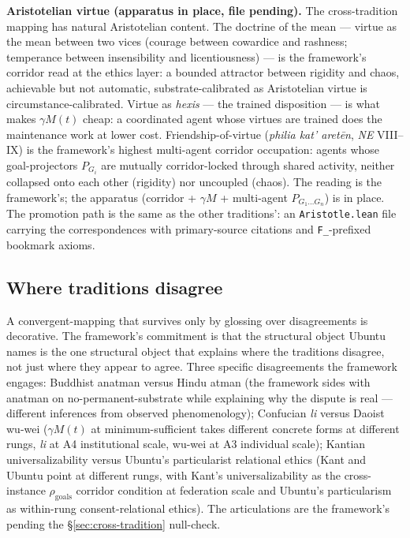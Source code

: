 \documentclass[11pt,a4paper]{article}
\begin{document}
\textbf{Aristotelian virtue (apparatus in place, file pending).} The cross-tradition mapping has natural Aristotelian content. The doctrine of the mean --- virtue as the mean between two vices (courage between cowardice and rashness; temperance between insensibility and licentiousness) --- is the framework's corridor read at the ethics layer: a bounded attractor between rigidity and chaos, achievable but not automatic, substrate-calibrated as Aristotelian virtue is circumstance-calibrated. Virtue as \emph{hexis} --- the trained disposition --- is what makes $\gamma M(t)$ cheap: a coordinated agent whose virtues are trained does the maintenance work at lower cost. Friendship-of-virtue (\emph{philia kat' aret\=en}, \emph{NE} VIII--IX) is the framework's highest multi-agent corridor occupation: agents whose goal-projectors $P_{G_i}$ are mutually corridor-locked through shared activity, neither collapsed onto each other (rigidity) nor uncoupled (chaos). The reading is the framework's; the apparatus (corridor + $\gamma M$ + multi-agent $P_{G_1 \ldots G_n}$) is in place. The promotion path is the same as the other traditions': an \texttt{Aristotle.lean} file carrying the correspondences with primary-source citations and \texttt{F\_}-prefixed bookmark axioms.

\subsection*{Where traditions disagree}

A convergent-mapping that survives only by glossing over disagreements is decorative. The framework's commitment is that the structural object Ubuntu names is the one structural object that explains where the traditions disagree, not just where they appear to agree. Three specific disagreements the framework engages: Buddhist anatman versus Hindu atman (the framework sides with anatman on no-permanent-substrate while explaining why the dispute is real --- different inferences from observed phenomenology); Confucian \emph{li} versus Daoist wu-wei ($\gamma M(t)$ at minimum-sufficient takes different concrete forms at different rungs, \emph{li} at A4 institutional scale, wu-wei at A3 individual scale); Kantian universalizability versus Ubuntu's particularist relational ethics (Kant and Ubuntu point at different rungs, with Kant's universalizability as the cross-instance $\rho_{\text{goals}}$ corridor condition at federation scale and Ubuntu's particularism as within-rung consent-relational ethics). The articulations are the framework's pending the \S\ref{sec:cross-tradition} null-check.
\end{document}
